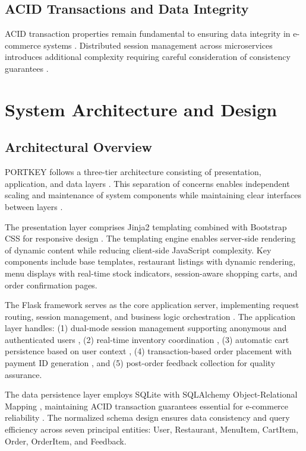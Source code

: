 \documentclass[conference]{IEEEtran}
\begin{document}
\subsection{ACID Transactions and Data Integrity}

ACID transaction properties remain fundamental to ensuring data integrity in e-commerce systems \cite{b91, b94, b97}. Distributed session management across microservices introduces additional complexity requiring careful consideration of consistency guarantees \cite{b62, b68}.

\section{System Architecture and Design}

\subsection{Architectural Overview}

PORTKEY follows a three-tier architecture consisting of presentation, application, and data layers \cite{b61, b64, b67}. This separation of concerns enables independent scaling and maintenance of system components while maintaining clear interfaces between layers \cite{b77, b78}.

The presentation layer comprises Jinja2 templating combined with Bootstrap CSS for responsive design \cite{b72}. The templating engine enables server-side rendering of dynamic content while reducing client-side JavaScript complexity. Key components include base templates, restaurant listings with dynamic rendering, menu displays with real-time stock indicators, session-aware shopping carts, and order confirmation pages.

The Flask framework serves as the core application server, implementing request routing, session management, and business logic orchestration \cite{b89}. The application layer handles: (1) dual-mode session management supporting anonymous and authenticated users \cite{b62, b65}, (2) real-time inventory coordination \cite{b63}, (3) automatic cart persistence based on user context \cite{b90}, (4) transaction-based order placement with payment ID generation \cite{b91}, and (5) post-order feedback collection for quality assurance.

The data persistence layer employs SQLite with SQLAlchemy Object-Relational Mapping \cite{b73}, maintaining ACID transaction guarantees essential for e-commerce reliability \cite{b91, b94, b97}. The normalized schema design ensures data consistency and query efficiency across seven principal entities: User, Restaurant, MenuItem, CartItem, Order, OrderItem, and Feedback.
\end{document}

